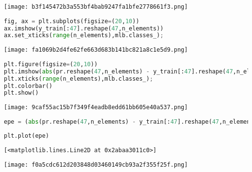 \texttt{[image: b3f145472b3a553bf4bab9247fa1bfe2778661f3.png]}

\begin{lstlisting}[language=Python]
fig, ax = plt.subplots(figsize=(20,10))
ax.imshow(y_train[:47].reshape(47,n_elements))
ax.set_xticks(range(n_elements),mlb.classes_);
\end{lstlisting}

\texttt{[image: fa1069b2d4fe62fe663d683b141bc821a8c1e5d9.png]}

\begin{lstlisting}[language=Python]
plt.figure(figsize=(20,10))
plt.imshow(abs(pr.reshape(47,n_elements) - y_train[:47].reshape(47,n_elements)));
plt.xticks(range(n_elements),mlb.classes_);
plt.colorbar()
plt.show()
\end{lstlisting}

\texttt{[image: 9caf55ac15b7f349f4eadb8edd61bb605e40a537.png]}

\begin{lstlisting}[language=Python]
epe = (abs(pr.reshape(47,n_elements) - y_train[:47].reshape(47,n_elements))).sum(axis=0) # error per element
\end{lstlisting}

\begin{lstlisting}[language=Python]
plt.plot(epe)
\end{lstlisting}

\begin{lstlisting}
[<matplotlib.lines.Line2D at 0x2abaa3011c0>]
\end{lstlisting}

\texttt{[image: f0a5cdc612d203848d03460149cb93a2f355f25f.png]}

